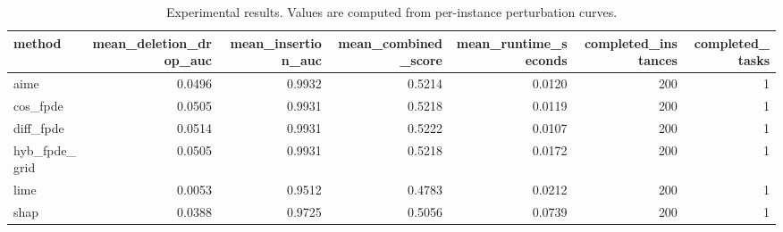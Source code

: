 \begin{table}[t]
\caption{Experimental results. Values are computed from per-instance perturbation curves.}
\label{tab:main_results_computed}
\centering
\begin{tabular}{lrrrrrr}
\toprule
method & mean\_deletion\_drop\_auc & mean\_insertion\_auc & mean\_combined\_score & mean\_runtime\_seconds & completed\_instances & completed\_tasks \\
\midrule
aime & 0.0496 & 0.9932 & 0.5214 & 0.0120 & 200 & 1 \\
cos\_fpde & 0.0505 & 0.9931 & 0.5218 & 0.0119 & 200 & 1 \\
diff\_fpde & 0.0514 & 0.9931 & 0.5222 & 0.0107 & 200 & 1 \\
hyb\_fpde\_grid & 0.0505 & 0.9931 & 0.5218 & 0.0172 & 200 & 1 \\
lime & 0.0053 & 0.9512 & 0.4783 & 0.0212 & 200 & 1 \\
shap & 0.0388 & 0.9725 & 0.5056 & 0.0739 & 200 & 1 \\
\bottomrule
\end{tabular}

\end{table}
